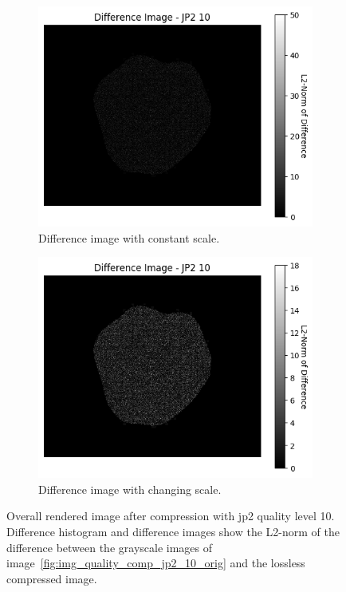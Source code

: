 \begin{figure}[htb]
\begin{subfigure}[b]{0.48\textwidth}
        \label{fig:img_quality_comp_jp2_10_histo}
    \end{subfigure}
    \\
    \begin{subfigure}[b]{0.48\textwidth}
        \centering
        \includegraphics[width=\textwidth]{doc/thesis/0_figures/compare_quality/set1/jp2_10_diff_heatmap.png}
        \caption{Difference image with constant scale.}
        \label{fig:img_quality_comp_jp2_10_diff}
    \end{subfigure}
    \begin{subfigure}[b]{0.48\textwidth}
        \centering
        \includegraphics[width=\textwidth]{doc/thesis/0_figures/compare_quality/set1/jp2_10_diff_heatmap_rel.png}
        \caption{Difference image with changing scale.}
        \label{fig:img_quality_comp_jp2_10_diff_rel}
    \end{subfigure}
    \caption{Overall rendered image after compression with \gls{jp2} quality level 10. Difference histogram and difference images show the L2-norm of the difference between the grayscale images of image~\ref{fig:img_quality_comp_jp2_10_orig} and the lossless compressed image.}
    \label{fig:img_quality_comp_jp2_10}
\end{figure}

